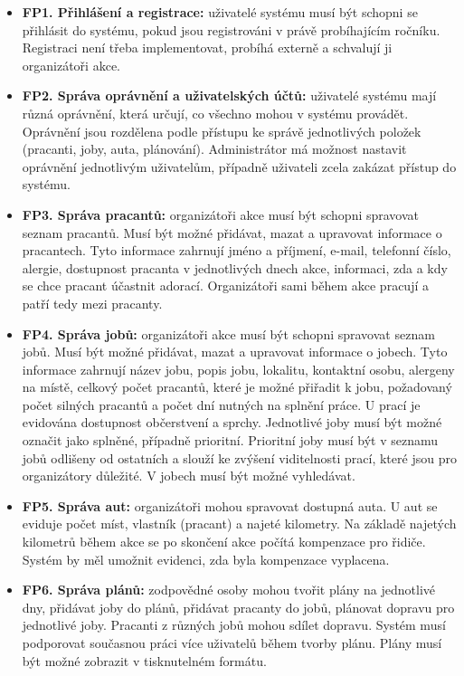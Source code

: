 \begin{itemize}
    \item \textbf{FP1. Přihlášení a registrace:} uživatelé systému musí být schopni se přihlásit do systému, pokud jsou registrováni v právě probíhajícím ročníku. Registraci není třeba implementovat, probíhá externě a schvalují ji organizátoři akce.
    \item \textbf{FP2. Správa oprávnění a uživatelských účtů:} uživatelé systému mají různá oprávnění, která určují, co všechno mohou v systému provádět. Oprávnění jsou rozdělena podle přístupu ke správě jednotlivých položek (pracanti, joby, auta, plánování). Administrátor má možnost nastavit oprávnění jednotlivým uživatelům, případně uživateli zcela zakázat přístup do systému.
    \item \textbf{FP3. Správa pracantů:} organizátoři akce musí být schopni spravovat seznam pracantů. Musí být možné přidávat, mazat a upravovat informace o pracantech. Tyto informace zahrnují jméno a příjmení, e-mail, telefonní číslo, alergie, dostupnost pracanta v jednotlivých dnech akce, informaci, zda a kdy se chce pracant účastnit adorací. Organizátoři sami během akce pracují a patří tedy mezi pracanty.
    \item \textbf{FP4. Správa jobů:} organizátoři akce musí být schopni spravovat seznam jobů. Musí být možné přidávat, mazat a upravovat informace o jobech. Tyto informace zahrnují název jobu, popis jobu, lokalitu, kontaktní osobu, alergeny na místě, celkový počet pracantů, které je možné přiřadit k jobu, požadovaný počet silných pracantů a počet dní nutných na splnění práce. U prací je evidována dostupnost občerstvení a sprchy. Jednotlivé joby musí být možné označit jako splněné, případně prioritní. Prioritní joby musí být v seznamu jobů odlišeny od ostatních a slouží ke zvýšení viditelnosti prací, které jsou pro organizátory důležité. V jobech musí být možné vyhledávat.
    \item \textbf{FP5. Správa aut:} organizátoři mohou spravovat dostupná auta. U aut se eviduje počet míst, vlastník (pracant) a najeté kilometry. Na základě najetých kilometrů během akce se po skončení akce počítá kompenzace pro řidiče. Systém by měl umožnit evidenci, zda byla kompenzace vyplacena.
    \item \textbf{FP6. Správa plánů:} zodpovědné osoby mohou tvořit plány na jednotlivé dny, přidávat joby do plánů, přidávat pracanty do jobů, plánovat dopravu pro jednotlivé joby. Pracanti z různých jobů mohou sdílet dopravu. Systém musí podporovat současnou práci více uživatelů během tvorby plánu. Plány musí být možné zobrazit v tisknutelném formátu.

\end{itemize}
